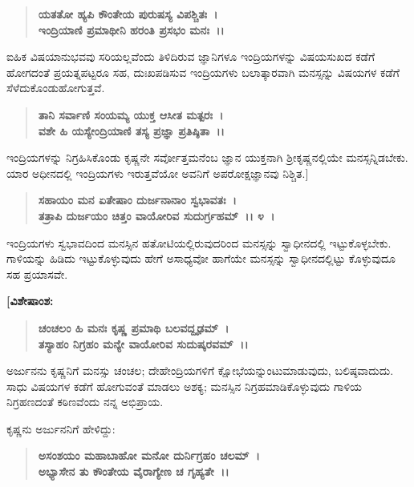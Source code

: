 \begin{verse}
\textbf{ಯತತೋ ಹ್ಯಪಿ ಕೌಂತೇಯ ಪುರುಷಸ್ಯ ವಿಪಶ್ಚಿತಃ~।}\\\textbf{ಇಂದ್ರಿಯಾಣಿ ಪ್ರಮಾಥೀನಿ ಹರಂತಿ ಪ್ರಸಭಂ ಮನಃ~।।} 
\end{verse}

ಐಹಿಕ ವಿಷಯಾನುಭವವು ಸರಿಯಲ್ಲವೆಂದು ತಿಳಿದಿರುವ ಜ್ಞಾನಿಗಳೂ ಇಂದ್ರಿಯಗಳನ್ನು ವಿಷಯಸುಖದ ಕಡೆಗೆ ಹೋಗದಂತೆ ಪ್ರಯತ್ನಪಟ್ಟರೂ ಸಹ, ದುಃಖಪಡಿಸುವ ಇಂದ್ರಿಯಗಳು ಬಲಾತ್ಕಾರವಾಗಿ ಮನಸ್ಸನ್ನು ವಿಷಯಗಳ ಕಡೆಗೆ ಸೆಳೆದುಕೊಂಡುಹೋಗುತ್ತವೆ.

\begin{verse}
\textbf{ತಾನಿ ಸರ್ವಾಣಿ ಸಂಯಮ್ಯ ಯುಕ್ತ ಆಸೀತ ಮತ್ಪರಃ~।}\\\textbf{ವಶೇ ಹಿ ಯಸ್ಯೇಂದ್ರಿಯಾಣಿ ತಸ್ಯ ಪ್ರಜ್ಞಾ ಪ್ರತಿಷ್ಠಿತಾ~।।}
\end{verse}

ಇಂದ್ರಿಯಗಳನ್ನು ನಿಗ್ರಹಿಸಿಕೊಂಡು ಕೃಷ್ಣನೇ ಸರ್ವೋತ್ತಮನೆಂಬ ಜ್ಞಾನ ಯುಕ್ತನಾಗಿ ಶ‍್ರೀಕೃಷ್ಣನಲ್ಲಿಯೇ ಮನಸ್ಸನ್ನಿಡಬೇಕು. ಯಾರ ಅಧೀನದಲ್ಲಿ ಇಂದ್ರಿಯಗಳು ಇರುತ್ತವೆಯೋ ಅವನಿಗೆ ಅಪರೋಕ್ಷಜ್ಞಾನವು ನಿಶ್ಚಿತ.]

\begin{verse}
\textbf{ಸಹಾಯಂ ಮನ ಏತೇಷಾಂ ದುರ್ಜನಾನಾಂ ಸ್ವಭಾವತಃ~।}\\\textbf{ತತ್ರಾಪಿ ದುರ್ಜಯಂ ಚಿತ್ತಂ ವಾಯೋರಿವ ಸುದುರ್ಗ್ರಹಮ್~।। ೪~।}
\end{verse}

ಇಂದ್ರಿಯಗಳು ಸ್ವಭಾವದಿಂದ ಮನಸ್ಸಿನ ಹತೋಟಿಯಲ್ಲಿರುವುದರಿಂದ ಮನಸ್ಸನ್ನು ಸ್ವಾಧೀನದಲ್ಲಿ ಇಟ್ಟುಕೊಳ್ಳಬೇಕು. ಗಾಳಿಯನ್ನು ಹಿಡಿದು ಇಟ್ಟುಕೊಳ್ಳುವುದು ಹೇಗೆ ಅಸಾಧ್ಯವೋ ಹಾಗೆಯೇ ಮನಸ್ಸನ್ನು ಸ್ವಾಧೀನದಲ್ಲಿಟ್ಟು ಕೊಳ್ಳುವುದೂ ಸಹ ಪ್ರಯಾಸವೇ. 

\newpage

\begin{flushleft}
\textbf{[ವಿಶೇಷಾಂಶ:}
\end{flushleft}

\begin{verse}
\textbf{ಚಂಚಲಂ ಹಿ ಮನಃ ಕೃಷ್ಣ ಪ್ರಮಾಥಿ ಬಲವದ್ದೃಢಮ್~।}\\\textbf{ತಸ್ಯಾಹಂ ನಿಗ್ರಹಂ ಮನ್ಯೇ ವಾಯೋರಿವ ಸುದುಷ್ಕರವಮ್~।।} 
\end{verse}

ಅರ್ಜುನನು ಕೃಷ್ಣನಿಗೆ ಮನಸ್ಸು ಚಂಚಲ; ದೇಹೇಂದ್ರಿಯಗಳಿಗೆ ಕ್ಷೋಭೆಯನ್ನುಂಟುಮಾಡುವುದು, ಬಲಿಷ್ಠವಾದುದು. ಸಾಧು ವಿಷಯಗಳ ಕಡೆಗೆ ಹೋಗುವಂತೆ ಮಾಡಲು ಅಶಕ್ಯ; ಮನಸ್ಸಿನ ನಿಗ್ರಹಮಾಡಿಕೊಳ್ಳುವುದು ಗಾಳಿಯ ನಿಗ್ರಹಣದಂತೆ ಕಠಿಣವೆಂದು ನನ್ನ ಅಭಿಪ್ರಾಯ.

\begin{flushleft}
ಕೃಷ್ಣನು ಅರ್ಜುನನಿಗೆ ಹೇಳಿದ್ದು:
\end{flushleft}

\begin{verse}
\textbf{ಅಸಂಶಯಂ ಮಹಾಬಾಹೋ ಮನೋ ದುರ್ನಿಗ್ರಹಂ ಚಲಮ್~।}\\\textbf{ಅಭ್ಯಾಸೇನ ತು ಕೌಂತೇಯ ವೈರಾಗ್ಯೇಣ ಚ ಗೃಹ್ಯತೇ~।।} 
\end{verse}


